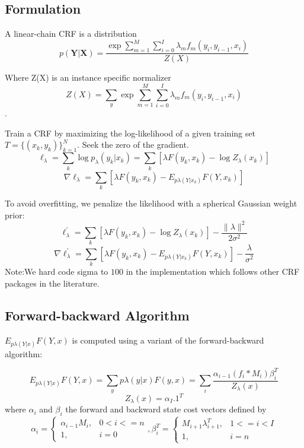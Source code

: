 \subsection{Formulation}
A linear-chain CRF \cite{DBLP:conf/naacl/ShaP03} is a distribution
    \[p(\boldsymbol Y | \boldsymbol X) = \frac{\exp{\sum_{m=1}^M \sum_{i=0}^{I} \lambda_m f_m(y_i,y_{i-1},x_i)}}{Z(X)}\]

Where Z(X) is an instance specific normalizer
\[Z(X) = \sum_{y} \exp{\sum_{m=1}^M \sum_{i=0}^{I} \lambda_m f_m(y_i,y_{i-1},x_i)}\].

Train a CRF by maximizing the log-likelihood of a given training set $ T=\{(x_k,y_k)\}_{k=1}^N$.
Seek the zero of the gradient.\\
    \[\ell_{\lambda}=\sum_k \log p_\lambda(y_k|x_k) =\sum_k[\lambda F(y_k,x_k)-\log Z_\lambda(x_k)]\]
    \[\nabla \ell_{\lambda}=\sum_k[\lambda F(y_k,x_k)-E_{p\lambda(Y|x_k)}F(Y,x_k)]\]

To avoid overfitting, we penalize the likelihood with a spherical Gaussian weight prior:\\
    \[\ell_{\lambda}^\prime=\sum_k[\lambda F(y_k,x_k)-\log Z_\lambda(x_k)]-\frac{\lVert \lambda \rVert^2}{2\sigma ^2}\]
    \[\nabla \ell_{\lambda}^\prime=\sum_k[\lambda F(y_k,x_k)-E_{p\lambda(Y|x_k)}F(Y,x_k)]-\frac{\lambda}{\sigma ^2}\]
Note:We hard code sigma to $100$ in the implementation which follows other CRF packages in the literature.

\subsection{Forward-backward Algorithm}
$E_{p\lambda(Y|x)}F(Y,x)$ is computed using a variant of the forward-backward algorithm:

    \[E_{p\lambda(Y|x)}F(Y,x) = \sum_y p\lambda(y|x)F(y,x) = \sum_i\frac{\alpha_{i-1}(f_i*M_i)\beta_i^T}{Z_\lambda(x)}\]
    \[Z_\lambda(x) = \alpha_I.1^T\]
    where $\alpha_i$ and $\beta_i$ the forward and backward state cost vectors defined by\\
  \[\alpha_i =
    \begin{cases}
    \alpha_{i-1}M_i, & 0<i<=n\\
    1, & i=0
    \end{cases}
    ,
    \beta_i^T =
    \begin{cases}
    M_{i+1}\lambda_{i+1}^T, & 1<=i<I\\
    1, & i=n
    \end{cases}
  \]

